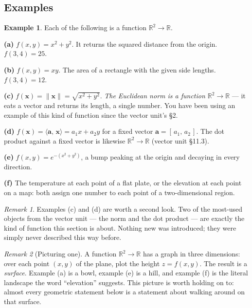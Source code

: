 \documentclass[11pt]{article}
\theoremstyle{plain}
\theoremstyle{definition}
\newtheorem{ex}{Example}[section]
\theoremstyle{remark}
\newtheorem*{rmk}{Remark}
\newcommand{\R}{\mathbb{R}}
\newcommand{\vc}[1]{\mathbf{#1}}
\newcommand{\norm}[1]{\lVert #1\rVert}
\newcommand{\ip}[2]{\langle #1,\, #2\rangle}
\begin{document}
\subsection{Examples}
\begin{ex}
Each of the following is a function $\R^{2}\to\R$.

\smallskip
\noindent\textbf{(a)} $f(x,y)=x^{2}+y^{2}$. It returns the squared distance from
the origin. $f(3,4)=25$.

\smallskip
\noindent\textbf{(b)} $f(x,y)=xy$. The area of a rectangle with the given side
lengths. $f(3,4)=12$.

\smallskip
\noindent\textbf{(c)} $f(\vc{x})=\norm{\vc{x}}=\sqrt{x^{2}+y^{2}}$. \emph{The
Euclidean norm is a function $\R^{2}\to\R$} --- it eats a vector and returns its
length, a single number. You have been using an example of this kind of function
since the vector unit's \S2.

\smallskip
\noindent\textbf{(d)} $f(\vc{x})=\ip{\vc{a}}{\vc{x}}=a_1x+a_2y$ for a fixed
vector $\vc{a}=[\,a_1,\,a_2\,]$. The dot product against a fixed vector is
likewise $\R^{2}\to\R$ (vector unit \S11.3).

\smallskip
\noindent\textbf{(e)} $f(x,y)=e^{-(x^{2}+y^{2})}$, a bump peaking at the origin
and decaying in every direction.

\smallskip
\noindent\textbf{(f)} The temperature at each point of a flat plate, or the
elevation at each point on a map: both assign one number to each point of a
two-dimensional region.
\end{ex}

\begin{rmk}
Examples (c) and (d) are worth a second look. Two of the most-used objects from
the vector unit --- the norm and the dot product --- are exactly the kind of
function this section is about. Nothing new was introduced; they were simply
never described this way before.
\end{rmk}

\begin{rmk}[Picturing one]
A function $\R^{2}\to\R$ has a graph in three dimensions: over each point
$(x,y)$ of the plane, plot the height $z=f(x,y)$. The result is a
\emph{surface}. Example (a) is a bowl, example (e) is a hill, and example (f) is
the literal landscape the word ``elevation'' suggests. This picture is worth
holding on to: almost every geometric statement below is a statement about
walking around on that surface.
\end{rmk}
\end{document}
